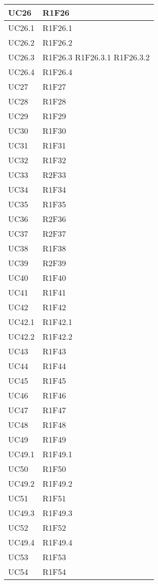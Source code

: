 \begin{center}
\begin{longtable}{|p{44mm}|p{22mm}|}
UC26 &
R1F26 
\\
\hline
UC26.1 &
R1F26.1 
\\
\hline
UC26.2 &
R1F26.2 
\\
\hline
UC26.3 &
R1F26.3 \newline
R1F26.3.1 \newline
R1F26.3.2 
\\
\hline
UC26.4 &
R1F26.4 
\\
\hline
UC27 &
R1F27 
\\
\hline
UC28 &
R1F28 
\\
\hline
UC29 &
R1F29 
\\
\hline
UC30 &
R1F30 
\\
\hline
UC31 &
R1F31 
\\
\hline
UC32 &
R1F32 
\\
\hline
UC33 &
R2F33 
\\
\hline
UC34 &
R1F34 
\\
\hline
UC35 &
R1F35 
\\
\hline
UC36 &
R2F36 
\\
\hline
UC37 &
R2F37 
\\
\hline
UC38 &
R1F38 
\\
\hline
UC39 &
R2F39 
\\
\hline
UC40 &
R1F40 
\\
\hline
UC41 &
R1F41 
\\
\hline
UC42 &
R1F42 
\\
\hline
UC42.1 &
R1F42.1 
\\
\hline
UC42.2 &
R1F42.2 
\\
\hline
UC43 &
R1F43 
\\
\hline
UC44 &
R1F44 
\\
\hline
UC45 &
R1F45 
\\
\hline
UC46 &
R1F46 
\\
\hline
UC47 &
R1F47 
\\
\hline
UC48 &
R1F48 
\\
\hline
UC49 &
R1F49 
\\
\hline
UC49.1 &
R1F49.1 
\\
\hline
UC50 &
R1F50 
\\
\hline
UC49.2 &
R1F49.2 
\\
\hline
UC51 &
R1F51 
\\
\hline
UC49.3 &
R1F49.3 
\\
\hline
UC52 &
R1F52 
\\
\hline
UC49.4 &
R1F49.4 
\\
\hline
UC53 &
R1F53 
\\
\hline
UC54 &
R1F54 

\end{longtable}
\end{center}
